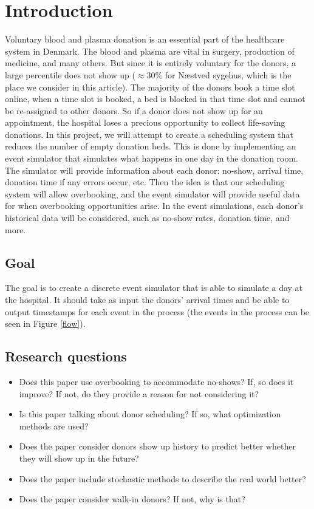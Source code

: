 \documentclass[a4paper,12pt]{article}
\begin{document}
\newpage

\section{Introduction}

Voluntary blood and plasma donation is an essential part of the healthcare system in Denmark. The blood and plasma are vital in surgery, production of medicine, and many others. But since it is entirely voluntary for the donors, a large percentile does not show up ($\approx 30\%$ for Næstved sygehus, which is the place we consider in this article). The majority of the donors book a time slot online, when a time slot is booked, a bed is blocked in that time slot and cannot be re-assigned to other donors. So if a donor does not show up for an appointment, the hospital loses a precious opportunity to collect life-saving donations. In this project, we will attempt to create a scheduling system that reduces the number of empty donation beds. This is done by implementing an event simulator that simulates what happens in one day in the donation room. The simulator will provide information about each donor: no-show, arrival time, donation time if any errors occur, etc. Then the idea is that our scheduling system will allow overbooking, and the event simulator will provide useful data for when overbooking opportunities arise. In the event simulations, each donor's historical data will be considered, such as no-show rates, donation time, and more.





\subsection{Goal}

The goal is to create a discrete event simulator that is able to simulate a day at the hospital. It should take as input the donors' arrival times and be able to output timestamps for each event in the process (the events in the process can be seen in Figure \ref{flow}).



\subsection{Research questions}

\begin{itemize}
    \item Does this paper use overbooking to accommodate no-shows? If, so does it improve? If not, do they provide a reason for not considering it?
    \item Is this paper talking about donor scheduling? If so, what optimization methods are used?
    \item Does the paper consider donors show up history to predict better whether they will show up in the future?
    \item Does the paper include stochastic methods to describe the real world better?
    \item Does the paper consider walk-in donors? If not, why is that?
\end{itemize}
\end{document}
